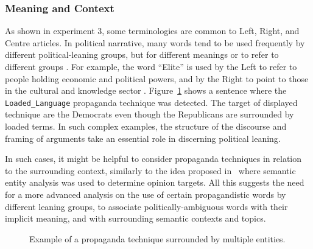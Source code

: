 \subsubsection{Meaning and Context}
As shown in experiment 3, some terminologies are common to Left, Right, and Centre articles. In political narrative, many words tend to be used frequently by different political-leaning groups, but for different meanings or to refer to different groups \citep{seargeant2020art}. For example, the word ``Elite'' is used by the Left to refer to people holding economic and political powers, and by the Right to point to those in the cultural and knowledge sector \citep{seargeant2020art}.  
Figure~\ref{fig:propaganda_example_2} shows a sentence where the \texttt{Loaded\_Language} propaganda technique was detected.
The target of displayed technique are the Democrats even though the Republicans are surrounded by loaded terms.
In such complex examples, the structure of the discourse and framing of arguments take an essential role in discerning political leaning. 

In such cases, it might be helpful to consider propaganda techniques in relation to the surrounding context, similarly to the idea proposed in~\citet{chen2017opinion} where semantic entity analysis was used to determine opinion targets. 
All this suggests the need for a more advanced analysis on the use of certain propagandistic words by different leaning groups, to associate politically-ambiguous words with their implicit meaning, and with surrounding semantic contexts and topics.



\begin{figure}[!hbtp]
    \centering
    \vspace{-20px}
    \caption{Example of a propaganda technique surrounded by multiple entities.}
    \vspace{-8px}
    \label{fig:propaganda_example_2}
\end{figure}

